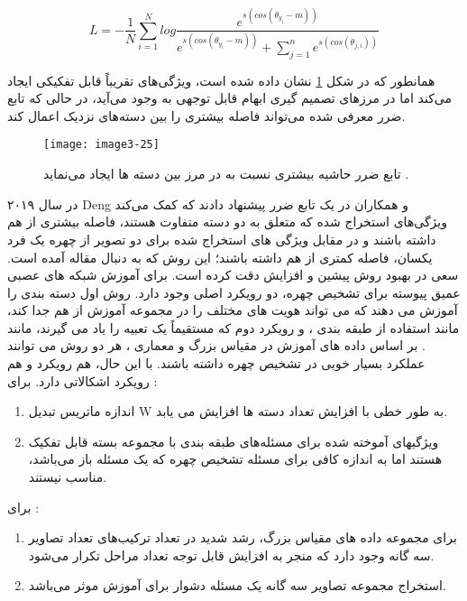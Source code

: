 \begin{equation}
\label{eq3-13}
L = - \frac{1}{N} \sum_{i=1}^{N} log \frac{e^{s(cos(\theta_{y_i}-m))}}{e^{s(cos(\theta_{y_i}-m))} + \sum_{j=1}^{n} e^{s(cos(\theta_{j, i}))}}
\end{equation}

\noindent
همانطور که در شکل \ref{image3-25} نشان داده شده است،  ویژگی‌های تقریباً قابل تفکیکی ایجاد می‌کند اما در مرزهای تصمیم گیری ابهام قابل توجهی به وجود می‌آید، در حالی که تابع ضرر معرفی شده می‌تواند فاصله بیشتری را بین دسته‌های نزدیک اعمال کند.

\begin{figure}[h]
\centering
  \texttt{[image: image3-25]}
  \caption{تابع ضرر  حاشیه بیشتری نسبت به  در مرز بین دسته ها ایجاد می‌نماید \cite{wang2018cosface}.}
  \label{image3-25}
\end{figure}

\noindent
در سال ۲۰۱۹ Deng و همکاران در \cite{deng2019arcface} یک تابع ضرر پیشنهاد دادند که کمک می‌کند ویژگی‌های استخراج شده که متعلق به دو دسته متفاوت هستند، فاصله بیشتری از هم داشته باشند و در مقابل ویژگی های استخراج شده برای دو تصویر از چهره یک فرد یکسان، فاصله کمتری از هم داشته باشند؛ این روش که به دنبال مقاله \cite{wang2018cosface} آمده است. سعی در بهبود روش پیشین و افزایش دقت کرده است. برای آموزش شبکه های عصبی عمیق پیوسته برای تشخیص چهره، دو رویکرد اصلی وجود دارد. روش اول دسته بندی را آموزش می دهند که می تواند هویت های مختلف را در مجموعه آموزش از هم جدا کند، مانند استفاده از طبقه بندی ، و رویکرد دوم که مستقیماً یک تعبیه را یاد می گیرند، مانند . بر اساس داده های آموزش در مقیاس بزرگ و معماری ، هر دو روش می توانند عملکرد بسیار خوبی در تشخیص چهره داشته باشند. با این حال، هم رویکرد  و هم رویکرد  اشکالاتی دارد.
\noindent
برای :
\begin{enumerate}
\item
	اندازه ماتریس تبدیل W به طور خطی با افزایش تعداد دسته ها  افزایش می یابد.‌
\item 
ویژگیهای آموخته شده برای مسئله‌های طبقه بندی با مجموعه بسته قابل تفکیک هستند اما به اندازه کافی برای مسئله تشخیص چهره که یک مسئله باز می‌باشد، مناسب نیستند. 
\end{enumerate}

\noindent
برای :
\begin{enumerate}
\item
 برای مجموعه داده های مقیاس بزرگ، رشد شدید در تعداد ترکیب‌های تعداد تصاویر سه گانه وجود دارد که منجر به افزایش قابل توجه تعداد مراحل تکرار می‌شود.
\item 
 استخراج مجموعه تصاویر سه گانه یک مسئله دشوار برای آموزش موثر می‌باشد. 
\end{enumerate}

